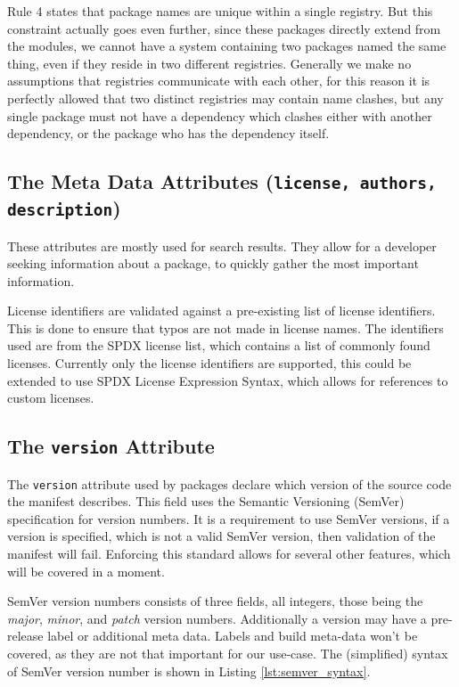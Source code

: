 Rule 4 states that package names are unique within a single registry. But this
constraint actually goes even further, since these packages directly extend
from the modules, we cannot have a system containing two packages named the
same thing, even if they reside in two different registries. Generally we make
no assumptions that registries communicate with each other, for this reason it
is perfectly allowed that two distinct registries may contain name clashes, but
any single package must not have a dependency which clashes either with another
dependency, or the package who has the dependency itself.

\subsection{The Meta Data Attributes ({\tt license, authors, description})}

These attributes are mostly used for search results. They allow for a developer
seeking information about a package, to quickly gather the most important
information.

License identifiers are validated against a pre-existing list of license
identifiers. This is done to ensure that typos are not made in license names.
The identifiers used are from the SPDX license list, which contains a list of
commonly found licenses. Currently only the license identifiers are supported,
this could be extended to use SPDX License Expression Syntax, which allows for
references to custom licenses.

\subsection{The {\tt version} Attribute}


The \texttt{version} attribute used by packages declare which version
of the source code the manifest describes. This field uses the Semantic
Versioning (SemVer) specification for version numbers. It is a requirement to
use SemVer versions, if a version is specified, which is not a valid SemVer
version, then validation of the manifest will fail. Enforcing this standard
allows for several other features, which will be covered in a moment.

SemVer version numbers consists of three fields, all integers, those being the
\emph{major}, \emph{minor}, and \emph{patch} version numbers. Additionally a
version may have a pre-release label or additional meta data. Labels and build
meta-data won't be covered, as they are not that important for our use-case.
The (simplified) syntax of SemVer version number is shown in Listing
\ref{lst:semver_syntax}.


